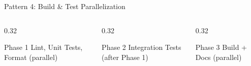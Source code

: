 \documentclass[aspectratio=169,11pt]{beamer}
\begin{document}
\begin{frame}{Pattern 4: Build \& Test Parallelization}
\begin{center}
    \end{center}

    \vspace{0.3cm}
    \begin{columns}[T]
        \begin{column}{0.32\textwidth}
            \begin{block}{Phase 1}
                \footnotesize
                Lint, Unit Tests, Format (parallel)
            \end{block}
        \end{column}
        \begin{column}{0.32\textwidth}
            \begin{block}{Phase 2}
                \footnotesize
                Integration Tests (after Phase 1)
            \end{block}
        \end{column}
        \begin{column}{0.32\textwidth}
            \begin{block}{Phase 3}
                \footnotesize
                Build + Docs (parallel)
            \end{block}
        \end{column}
    \end{columns}
\end{frame}
\end{document}
